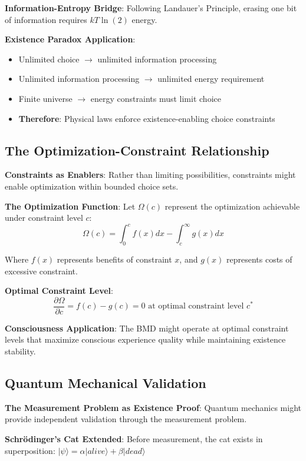 \documentclass[12pt]{article}
\begin{document}
\textbf{Information-Entropy Bridge}: Following Landauer's Principle, erasing one bit of information requires $kT \ln(2)$ energy.

\textbf{Existence Paradox Application}:
\begin{itemize}
\item Unlimited choice $\rightarrow$ unlimited information processing
\item Unlimited information processing $\rightarrow$ unlimited energy requirement
\item Finite universe $\rightarrow$ energy constraints must limit choice
\item \textbf{Therefore}: Physical laws enforce existence-enabling choice constraints
\end{itemize}

\subsection{The Optimization-Constraint Relationship}

\textbf{Constraints as Enablers}: Rather than limiting possibilities, constraints might enable optimization within bounded choice sets.

\textbf{The Optimization Function}:
Let $\Omega(c)$ represent the optimization achievable under constraint level $c$:
$$\Omega(c) = \int_0^c f(x)dx - \int_c^{\infty} g(x)dx$$

Where $f(x)$ represents benefits of constraint $x$, and $g(x)$ represents costs of excessive constraint.

\textbf{Optimal Constraint Level}: 
$$\frac{\partial\Omega}{\partial c} = f(c) - g(c) = 0 \text{ at optimal constraint level } c^*$$

\textbf{Consciousness Application}: The BMD might operate at optimal constraint levels that maximize conscious experience quality while maintaining existence stability.

\subsection{Quantum Mechanical Validation}

\textbf{The Measurement Problem as Existence Proof}: Quantum mechanics might provide independent validation through the measurement problem.

\textbf{Schrödinger's Cat Extended}: Before measurement, the cat exists in superposition: $|\psi\rangle = \alpha|alive\rangle + \beta|dead\rangle$
\end{document}
